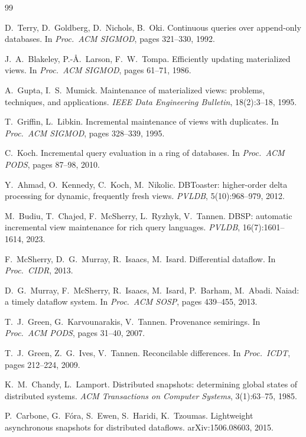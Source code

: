 \documentclass[11pt,a4paper]{article}
\renewcommand{\_}{\oldunderscore\allowbreak}
\begin{document}
\begin{thebibliography}{99}
\small

 D.~Terry, D.~Goldberg, D.~Nichols, B.~Oki. Continuous queries over append-only
databases. In \emph{Proc.\ ACM SIGMOD}, pages 321--330, 1992.

 J.~A.~Blakeley, P.-{\AA}.~Larson, F.~W.~Tompa. Efficiently updating materialized
views. In \emph{Proc.\ ACM SIGMOD}, pages 61--71, 1986.

 A.~Gupta, I.~S.~Mumick. Maintenance of materialized views: problems, techniques, and
applications. \emph{IEEE Data Engineering Bulletin}, 18(2):3--18, 1995.

 T.~Griffin, L.~Libkin. Incremental maintenance of views with duplicates. In
\emph{Proc.\ ACM SIGMOD}, pages 328--339, 1995.

 C.~Koch. Incremental query evaluation in a ring of databases. In \emph{Proc.\ ACM
PODS}, pages 87--98, 2010.

 Y.~Ahmad, O.~Kennedy, C.~Koch, M.~Nikolic. DBToaster: higher-order delta
processing for dynamic, frequently fresh views. \emph{PVLDB}, 5(10):968--979, 2012.

 M.~Budiu, T.~Chajed, F.~McSherry, L.~Ryzhyk, V.~Tannen. DBSP: automatic incremental
view maintenance for rich query languages. \emph{PVLDB}, 16(7):1601--1614, 2023.

 F.~McSherry, D.~G.~Murray, R.~Isaacs, M.~Isard. Differential dataflow. In
\emph{Proc.\ CIDR}, 2013.

 D.~G.~Murray, F.~McSherry, R.~Isaacs, M.~Isard, P.~Barham, M.~Abadi. Naiad: a timely
dataflow system. In \emph{Proc.\ ACM SOSP}, pages 439--455, 2013.

 T.~J.~Green, G.~Karvounarakis, V.~Tannen. Provenance semirings. In \emph{Proc.\ ACM
PODS}, pages 31--40, 2007.

 T.~J.~Green, Z.~G.~Ives, V.~Tannen. Reconcilable differences. In \emph{Proc.\ ICDT},
pages 212--224, 2009.

 K.~M.~Chandy, L.~Lamport. Distributed snapshots: determining global states of
distributed systems. \emph{ACM Transactions on Computer Systems}, 3(1):63--75, 1985.

 P.~Carbone, G.~F{\'o}ra, S.~Ewen, S.~Haridi, K.~Tzoumas. Lightweight
asynchronous snapshots for distributed dataflows. arXiv:1506.08603, 2015.


\end{thebibliography}
\end{document}
